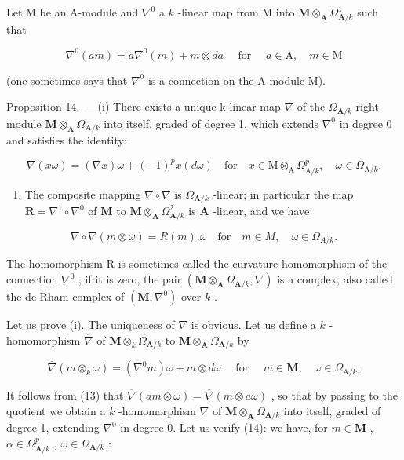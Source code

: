 Let M be an A-module and \(\nabla^{0}\) a \(k\) -linear map from M into \(\mathbf{M} \otimes_{\mathbf{A}} \Omega_{\mathbf{A}/k}^{1}\) such that

\[
\nabla^ {0} (a m) = a \nabla^ {0} (m) + m \otimes d a \quad \text { for } \quad a \in \mathrm{A}, \quad m \in \mathrm{M}\tag{13}
\]

(one sometimes says that \(\nabla^{0}\) is a connection on the A-module M).

Proposition 14. --- (i) There exists a unique k-linear map \(\nabla\) of the \(\Omega_{\mathbf{A}/k}\) right module \(\mathbf{M} \otimes_{\mathbf{A}} \Omega_{\mathbf{A}/k}\) into itself, graded of degree 1, which extends \(\nabla^{0}\) in degree 0 and satisfies the identity:

\[
\nabla (x \omega) = (\nabla x) \omega + (- 1) ^ {p} x (d \omega) \quad \mathrm{for} \quad x \in \mathrm{M} \otimes_ {\mathrm{A}} \Omega_ {\mathrm{A} / k} ^ {p}, \quad \omega \in \Omega_ {\mathrm{A} / k}. \tag {14}
\]

\begin{enumerate}
\def\labelenumi{(\roman{enumi})}
\setcounter{enumi}{1}
\tightlist
\item
  The composite mapping \(\nabla \circ \nabla\) is \(\Omega_{\mathbf{A} / k}\) -linear; in particular the map \(\mathbf{R} = \nabla^{1} \circ \nabla^{0}\) of \(\mathbf{M}\) to \(\mathbf{M} \otimes_{\mathbf{A}} \Omega_{\mathbf{A} / k}^{2}\) is \(\mathbf{A}\) -linear, and we have
\end{enumerate}

\[
\nabla \circ \nabla (m \otimes \omega) = R (m). \omega \quad \mathrm{for} \quad m \in M, \quad \omega \in \Omega_ {A / k}.
\]

The homomorphism R is sometimes called the curvature homomorphism of the connection \(\nabla^{0}\) ; if it is zero, the pair \((\mathbf{M} \otimes_{\mathbf{A}} \Omega_{\mathbf{A}/k}, \nabla)\) is a complex, also called the de Rham complex of \((\mathbf{M}, \nabla^{0})\) over \(k\) .

Let us prove (i). The uniqueness of \(\nabla\) is obvious. Let us define a \(k\) -homomorphism \(\overline{\nabla}\) of \(\mathbf{M} \otimes_k \Omega_{\mathbf{A}/k}\) to \(\mathbf{M} \otimes_{\mathbf{A}} \Omega_{\mathbf{A}/k}\) by

\[
\overline {{{\nabla}}} (m \otimes_ {k} \omega) = (\nabla^ {0} m) \omega + m \otimes d \omega \quad \text { for } \quad m \in \mathbf {M}, \quad \omega \in \Omega_ {\mathrm{A} / k}.
\]

It follows from (13) that \(\overline{\nabla}(am \otimes \omega) = \overline{\nabla}(m \otimes a\omega)\) , so that by passing to the quotient we obtain a \(k\) -homomorphism \(\nabla\) of \(\mathbf{M} \otimes_{\mathbf{A}} \Omega_{\mathbf{A}/k}\) into itself, graded of degree 1, extending \(\nabla^{0}\) in degree 0. Let us verify (14): we have, for \(m \in \mathbf{M}\) , \(\alpha \in \Omega_{\mathbf{A}/k}^{p}\) , \(\omega \in \Omega_{\mathbf{A}/k}\) :

